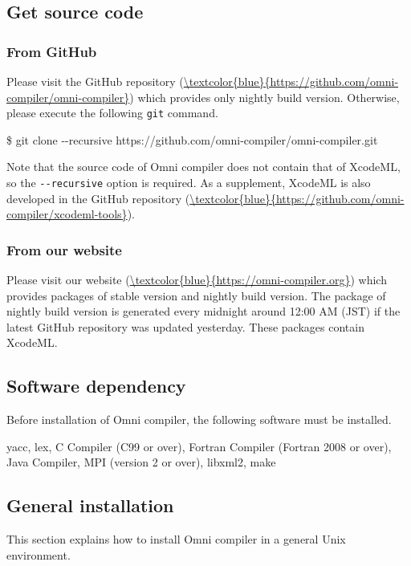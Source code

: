 \documentclass[graybox]{svmult}
\begin{document}
\subsection{Get source code}
\subsubsection{From GitHub}
Please visit the GitHub repository (\url{\textcolor{blue}{https://github.com/omni-compiler/omni-compiler}}) which provides only nightly build version.
Otherwise, please execute the following {\tt git} command.

\begin{svgraybox}
\$ git clone {-}{-}recursive https://github.com/omni-compiler/omni-compiler.git
\end{svgraybox}
Note that the source code of Omni compiler does not contain that of XcodeML, so the  {\tt {-}{-}recursive} option is required.
As a supplement, 
XcodeML is also developed in the GitHub repository (\url{\textcolor{blue}{https://github.com/omni-compiler/xcodeml-tools}}).

\subsubsection{From our website}
Please visit our website (\url{\textcolor{blue}{https://omni-compiler.org}}) which provides packages of stable version and nightly build version.
The package of nightly build version is generated every midnight around 12:00 AM (JST) if the latest GitHub repository was updated yesterday.
These packages contain XcodeML.

\subsection{Software dependency}
Before installation of Omni compiler, the following software must be installed.
\begin{svgraybox}
yacc, lex, C Compiler (C99 or over), Fortran Compiler (Fortran 2008 or over), Java Compiler, MPI (version 2 or over), libxml2, make
\end{svgraybox}

\subsection{General installation}
This section explains how to install Omni compiler in a general Unix environment.
\end{document}
